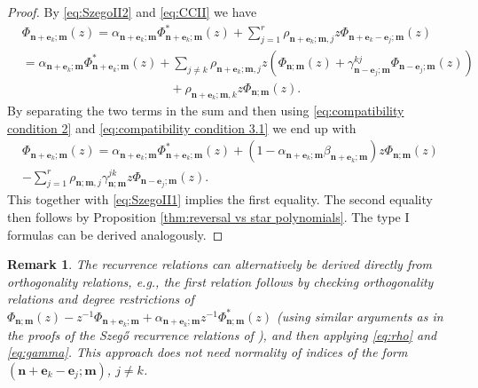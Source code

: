 \documentclass[reqno,centertags,11pt,draft]{amsart}
\newtheorem{rem}[thm]{Remark}
\begin{document}
\begin{proof}
    By \eqref{eq:SzegoII2} and \eqref{eq:CCII} we have
    \begin{align*}
        & \Phi_{\bm{n}+\bm{e}_k;\bm{m}}(z) = \alpha_{\bm{n}+\bm{e}_k;\bm{m}}\Phi_{\bm{n}+\bm{e}_k;\bm{m}}^*(z) + \sum_{j = 1}^r \rho_{\bm{n}+\bm{e}_k;\bm{m},j}z\Phi_{\bm{n}+\bm{e}_k-\bm{e}_j;\bm{m}}(z) \\ & 
        = \alpha_{\bm{n}+\bm{e}_k;\bm{m}}\Phi_{\bm{n}+\bm{e}_k;\bm{m}}^*(z) + \sum_{j \neq k}\rho_{\bm{n}+\bm{e}_k;\bm{m},j}z(\Phi_{\bm{n};\bm{m}}(z) + \gamma_{\bm{n}-\bm{e}_j;\bm{m}}^{kj}\Phi_{\bm{n}-\bm{e}_j;\bm{m}}(z)) \\ & \hspace{5cm}+ \rho_{\bm{n}+\bm{e}_k;\bm{m},k}z\Phi_{\bm{n};\bm{m}}(z).
    \end{align*}
    By separating the two terms in the sum and then using \eqref{eq:compatibility condition 2} and \eqref{eq:compatibility condition 3.1} we end up with
    \begin{multline*}
        \Phi_{\bm{n}+\bm{e}_k;\bm{m}}(z) = \alpha_{\bm{n}+\bm{e}_k;\bm{m}}\Phi_{\bm{n}+\bm{e}_k;\bm{m}}^*(z) + (1 - \alpha_{\bm{n}+\bm{e}_k;\bm{m}}\beta_{\bm{n}+\bm{e}_k;\bm{m}})z\Phi_{\bm{n};\bm{m}}(z) \\ - \sum_{j = 1}^r\rho_{\bm{n};\bm{m},j}\gamma_{\bm{n};\bm{m}}^{jk}z\Phi_{\bm{n}-\bm{e}_j;\bm{m}}(z).
    \end{multline*}
    This together with \eqref{eq:SzegoII1} implies the first equality. %
    The second equality then follows by Proposition \ref{thm:reversal vs star polynomials}. The type I formulas can be derived analogously. 
\end{proof}

\begin{rem}
    The recurrence relations can alternatively be derived directly from orthogonality relations, e.g., the first relation follows by checking orthogonality relations and degree restrictions of $\Phi_{\bm{n};\bm{m}}(z) - z^{-1}\Phi_{\bm{n}+\bm{e}_k;\bm{m}}+\alpha_{\bm{n}+\bm{e}_k;\bm{m}}z^{-1}\Phi_{\bm{n};\bm{m}}^*(z)$ (using similar arguments as in the proofs of the Szeg\H{o} recurrence relations of \cite{KVMOPUC}), and then applying \eqref{eq:rho} and \eqref{eq:gamma}. This approach does not need normality of indices of the form $(\bm{n}+\bm{e}_k-\bm{e}_j;\bm{m})$, $j \neq k$. 
\end{rem}
\end{document}

